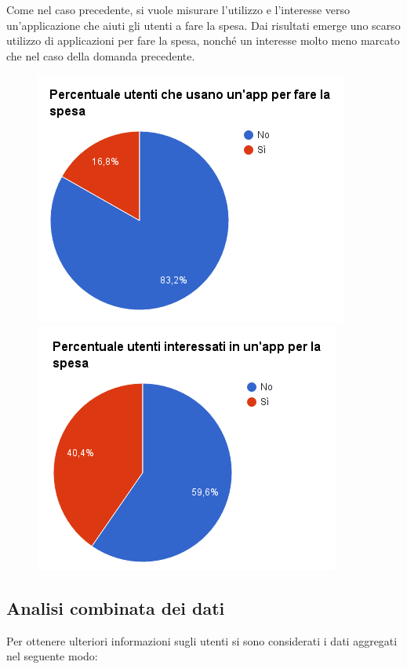 Come nel caso precedente, si vuole misurare l'utilizzo e l'interesse verso un'applicazione che aiuti gli utenti a fare
la spesa. Dai risultati emerge uno scarso utilizzo di applicazioni per fare la spesa, nonché un interesse molto meno marcato
che nel caso della domanda precedente.

\begin{figure}[H]
\centering
\begin{minipage}{.48\textwidth}
	\includegraphics[scale=0.45]{img/chart_usi_app_spesa}
\end{minipage}
\hfill
\begin{minipage}{.49\textwidth}
	\includegraphics[scale=0.45]{img/chart_vorresti_app_spesa}
\end{minipage}
\end{figure}

\subsection{Analisi combinata dei dati}
Per ottenere ulteriori informazioni sugli utenti si sono considerati i
dati aggregati nel seguente modo:


